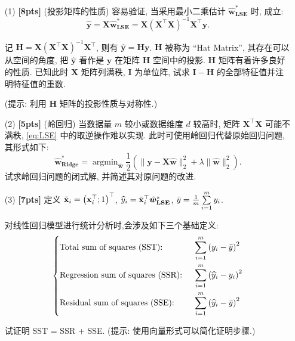 \documentclass[a4paper,UTF8]{article}
\numberwithin{equation}{section}
\theoremstyle{definition}
\def \X {\mathbf{X}}
\def \w {\hat{\boldsymbol{w}}}
\def \y {\mathbf{y}}
\def \x {\mathbf{x}}
\def \hy {\widehat{y}}
\def \by {\Bar{y}}
\def \H {\mathbf{H}}
\def \I {\mathbf{I}}
\begin{document}
\begin{enumerate}
\item[(1)] \textbf{[8pts]} (投影矩阵的性质) 
容易验证, 当采用最小二乘估计 $\w_{\textbf{LSE}}^*$ 时, 成立: 
\begin{equation*}
    \mathbf{\hy} = \X \w_{\textbf{LSE}}^* = \X\left(\X^\top\X\right)^{-1}\X^\top\y.
\end{equation*}

记 $\H = \X\left(\X^\top\X\right)^{-1}\X^\top$, 则有 $\mathbf{\hy} = \H\y$. $\H$ 被称为 “Hat Matrix”, 其存在可以从空间的角度, 把 $\mathbf{\hy}$ 看作是 $\y$ 在矩阵 $\H$ 空间中的投影. $\H$ 矩阵有着许多良好的性质.
已知此时 $\X$ 矩阵列满秩, $\I$ 为单位阵, 试求 $\I - \H$ 的全部特征值并注明特征值的重数.

(提示: 利用 $\H$ 矩阵的投影性质与对称性.)



\item[(2)] \textbf{[5pts]} (岭回归) 当数据量 $m$ 较小或数据维度 $d$ 较高时, 矩阵 $\X^\top\X$ 可能不满秩, \ref{eq:LSE} 中的取逆操作难以实现. 此时可使用岭回归代替原始回归问题, 其形式如下: 
\begin{equation}
    \label{eq:Ridge}
    \w_{\textbf{Ridge}}^* = \mathop{\arg\min}_{\w} \frac{1}{2}\left(\lVert \y - \X \w \rVert_2^2 +\lambda \lVert \w \rVert_2^2\right).
\end{equation}
试求岭回归问题的闭式解, 并简述其对原问题的改进.

\item[(3)] \textbf{[7pts]} 定义 $\Tilde{\x}_i = \left(\x_i^\top;1\right)^\top$,
$\hy_i = \Tilde{\x}_i^\top \w_{\textbf{LSE}}^*$,
$\by = \frac{1}{m} \sum\limits_{i=1}^m y_i $. 

对线性回归模型进行统计分析时,会涉及如下三个基础定义: 
\begin{equation*}
    \left\{
        \begin{aligned}
        &\text{Total sum of squares (SST): }& &\sum\limits_{i=1}^m\left(y_i-\by\right)^2 \\
        &\text{Regression sum of squares (SSR): }& &\sum\limits_{i=1}^m\left(\hy_i-y_i\right)^2 \\
        &\text{Residual sum of squares (SSE): }& &\sum\limits_{i=1}^m\left(\hy_i-\by\right)^2
        \end{aligned}
    \right.
\end{equation*}

试证明 SST = SSR + SSE. (提示: 使用向量形式可以简化证明步骤.)



\end{enumerate}
\end{document}
